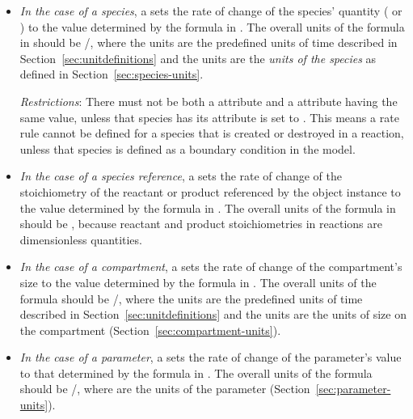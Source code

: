 \begin{itemize}
  
\item \emph{In the case of a species}, a \RateRule sets the rate
  of change of the species' quantity ( or
  ) to the value determined by the
  formula in .  The overall units of the formula in
   should be /, where the  units are
  the predefined units of time described in
  Section~\ref{sec:unitdefinitions} and the  units are the \emph{units of the species} as defined
  in Section~\ref{sec:species-units}.
  
  \emph{Restrictions}: There must not be both a \RateRule
   attribute and a \SpeciesReference {}
  attribute having the same value, unless that species has its
   attribute is set to .  This
  means a rate rule cannot be defined for a species that is
  created or destroyed in a reaction, unless that species is
  defined as a boundary condition in the model.

\item \emph{In the case of a species reference}, a \RateRule sets
  the rate of change of the stoichiometry of the reactant or
  product referenced by the \SpeciesReference object instance to
  the value determined by the formula in .  The
  overall units of the formula in  should be
  , because reactant and product
  stoichiometries in reactions are dimensionless quantities.
  
\item \emph{In the case of a compartment}, a \RateRule sets the
  rate of change of the compartment's size to the value determined
  by the formula in .  The overall units of the
  formula should be /, where the
   units are the predefined units of time described
  in Section~\ref{sec:unitdefinitions} and the 
  units are the units of size on the compartment
  (Section~\ref{sec:compartment-units}).

\item \emph{In the case of a parameter}, a \RateRule sets the rate
  of change of the parameter's value to that determined by the
  formula in .  The overall units of the formula should
  be /, where  are the
  units of the parameter (Section~\ref{sec:parameter-units}).

\end{itemize}

